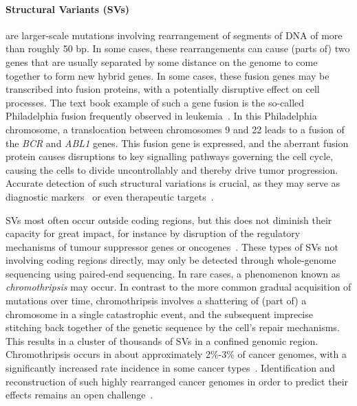 \begin{justify}
\paragraph{Structural Variants (SVs)} are larger-scale mutations involving rearrangement of segments of DNA of more than roughly 50 bp. In some cases, these rearrangements can cause (parts of) two genes that are usually separated by some distance on the genome to come together to form new hybrid genes. In some cases, these fusion genes may be transcribed into fusion proteins, with a potentially disruptive effect on cell processes. The text book example of such a gene fusion is the so-called Philadelphia fusion frequently observed in leukemia~\cite{de1982cellular}. In this Philadelphia chromosome, a translocation between chromosomes 9 and 22 leads to a fusion of the \emph{BCR} and \emph{ABL1} genes. This fusion gene is expressed, and the aberrant fusion protein causes disruptions to key signalling pathways governing the cell cycle, causing the cells to divide uncontrollably and thereby drive tumor progression. Accurate detection of such structural variations is crucial, as they may serve as diagnostic markers~\cite{nowell1960chromosome,nowell1961chromosome} or even therapeutic targets~\cite{druker2001activity,druker2001efficacy}.

SVs most often occur outside coding regions, but this does not diminish their capacity for great impact, for instance by disruption of the regulatory mechanisms of tumour suppressor genes or oncogenes~\cite{yi2018patterns}. These types of SVs not involving coding regions directly, may only be detected through whole-genome sequencing using paired-end sequencing. In rare cases, a phenomenon known as \emph{chromothripsis} may occur. In contrast to the more common gradual acquisition of mutations over time, chromothripsis involves a shattering of (part of) a chromosome in a single catastrophic event, and the subsequent imprecise stitching back together of the genetic sequence by the cell's repair mechanisms. This results in a cluster of thousands of SVs in a confined genomic region. Chromothripsis occurs in about approximately 2\%-3\% of cancer genomes, with a significantly increased rate incidence in some cancer types~\cite{luijten2018}. Identification and reconstruction of such highly rearranged cancer genomes in order to predict their effects remains an open challenge~\cite{yang2016chromothripsis,govind2014}.



\end{justify}
